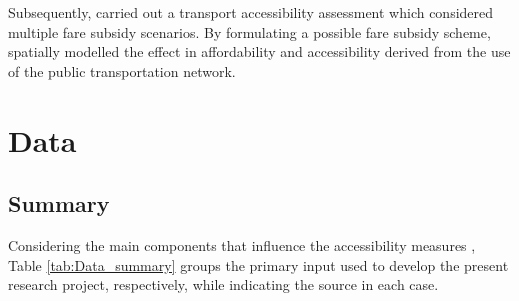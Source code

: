 \documentclass[12pt, a4paper]{report}
\begin{document}
Subsequently, \cite{guzmanAccessibilityAffordabilityEquity2018} carried out a transport accessibility assessment which considered multiple fare subsidy scenarios. By formulating a possible fare subsidy scheme, \cite{guzmanAccessibilityAffordabilityEquity2018} spatially modelled the effect in affordability and accessibility  derived from the use of the public transportation network.




\chapter{Data} \label{Chap3}


\section{Summary}

Considering the main components that influence the accessibility measures \citep{pereiraIntroductionUrbanAccessibility2023a}, Table \ref{tab:Data_summary} groups the primary input used to develop the present research project, respectively, while indicating the source in each case.
\end{document}
